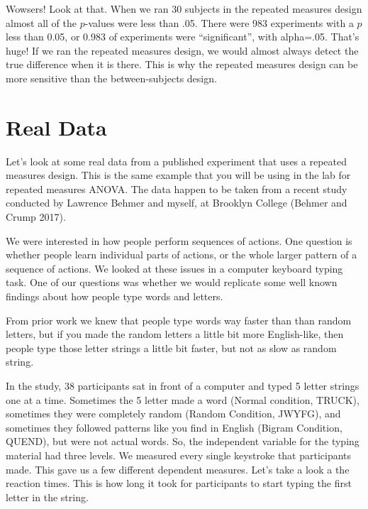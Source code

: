 \documentclass[
  letterpaper,
  DIV=11,
  numbers=noendperiod]{scrreprt}
\begin{document}
Wowsers! Look at that. When we ran 30 subjects in the repeated measures
design almost all of the \(p\)-values were less than .05. There were 983
experiments with a \(p\) less than 0.05, or 0.983 of experiments were
``significant'', with alpha=.05. That's huge! If we ran the repeated
measures design, we would almost always detect the true difference when
it is there. This is why the repeated measures design can be more
sensitive than the between-subjects design.

\section{Real Data}\label{real-data}

Let's look at some real data from a published experiment that uses a
repeated measures design. This is the same example that you will be
using in the lab for repeated measures ANOVA. The data happen to be
taken from a recent study conducted by Lawrence Behmer and myself, at
Brooklyn College (Behmer and Crump 2017).

We were interested in how people perform sequences of actions. One
question is whether people learn individual parts of actions, or the
whole larger pattern of a sequence of actions. We looked at these issues
in a computer keyboard typing task. One of our questions was whether we
would replicate some well known findings about how people type words and
letters.

From prior work we knew that people type words way faster than than
random letters, but if you made the random letters a little bit more
English-like, then people type those letter strings a little bit faster,
but not as slow as random string.

In the study, 38 participants sat in front of a computer and typed 5
letter strings one at a time. Sometimes the 5 letter made a word (Normal
condition, TRUCK), sometimes they were completely random (Random
Condition, JWYFG), and sometimes they followed patterns like you find in
English (Bigram Condition, QUEND), but were not actual words. So, the
independent variable for the typing material had three levels. We
measured every single keystroke that participants made. This gave us a
few different dependent measures. Let's take a look a the reaction
times. This is how long it took for participants to start typing the
first letter in the string.
\end{document}
